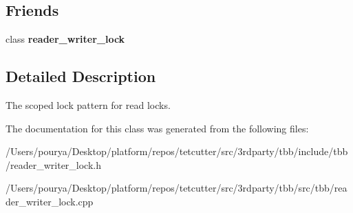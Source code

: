 \subsection*{Friends}
\begin{DoxyCompactItemize}
\item 
\hypertarget{classtbb_1_1interface5_1_1reader__writer__lock_1_1scoped__lock__read_afb01bc2e211c782503ef5088003f120f}{}class {\bfseries reader\+\_\+writer\+\_\+lock}\label{classtbb_1_1interface5_1_1reader__writer__lock_1_1scoped__lock__read_afb01bc2e211c782503ef5088003f120f}

\end{DoxyCompactItemize}


\subsection{Detailed Description}
The scoped lock pattern for read locks. 

The documentation for this class was generated from the following files\+:\begin{DoxyCompactItemize}
\item 
/\+Users/pourya/\+Desktop/platform/repos/tetcutter/src/3rdparty/tbb/include/tbb/reader\+\_\+writer\+\_\+lock.\+h\item 
/\+Users/pourya/\+Desktop/platform/repos/tetcutter/src/3rdparty/tbb/src/tbb/reader\+\_\+writer\+\_\+lock.\+cpp\end{DoxyCompactItemize}
